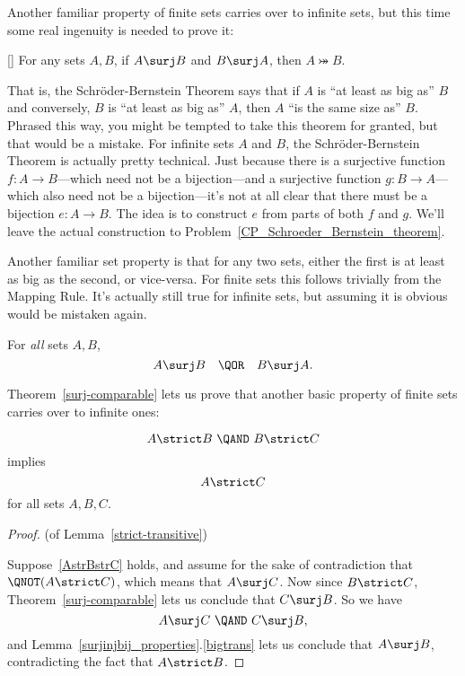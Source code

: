 Another familiar property of finite sets carries over to infinite
sets, but this time some real ingenuity is needed to prove it:
\begin{theorem}\label{S-B_thm} \mbox{}
 [] For any sets $A,B$, if $A \surj B$ and
 $B \surj A$, then $A \bij B$.
\end{theorem}

That is, the Schr\"oder-Bernstein Theorem says that if $A$ is ``at least
as big as'' $B$ and conversely, $B$ is ``at least as big as'' $A$, then $A$
``is the same size as'' $B$.  Phrased this way, you might be tempted to
take this theorem for granted, but that would be a mistake.  For
infinite sets $A$ and $B$, the Schr\"oder-Bernstein Theorem is
actually pretty technical.  Just because there is a surjective
function $f:A\to B$---which need not be a bijection---and a surjective
function $g:B \to A$---which also need not be a bijection---it's not
at all clear that there must be a bijection $e:A \to B$.  The idea is
to construct $e$ from parts of both $f$ and $g$.  We'll leave the
actual construction to Problem~\ref{CP_Schroeder_Bernstein_theorem}.

Another familiar set property is that for any two sets, either the
first is at least as big as the second, or vice-versa.  For finite
sets this follows trivially from the Mapping Rule.  It's actually
still true for infinite sets, but assuming it is obvious would be
mistaken again.
  \begin{theorem}\label{surj-comparable}
    For \emph{all} sets $A,B$,
    \[
    A \surj B\quad \QOR\quad  B \surj A.
    \]
  \end{theorem}

Theorem~\ref{surj-comparable} lets us prove that another basic
property of finite sets carries over to infinite ones:
\begin{lemma}\label{strict-transitive}
\begin{equation}\label{AstrBstrC}
A \strict B\ \QAND\ B \strict C
\end{equation}
implies
\[
A \strict C
\]
for all sets $A,B,C$.
\end{lemma}

\begin{proof} (of Lemma~\ref{strict-transitive})

Suppose~\ref{AstrBstrC} holds, and assume for the sake of
contradiction that $\QNOT(A \strict C)$, which means that $A \surj C$.
Now since $B \strict C$, Theorem~\ref{surj-comparable} lets us
conclude that $C \surj B$.  So we have
\[
A \surj C\ \QAND\ C \surj B,
\]
and Lemma~\ref{surjinjbij_properties}.\ref{bigtrans} lets us conclude
that $A \surj B$, contradicting the fact that $A \strict B$.
\end{proof}

